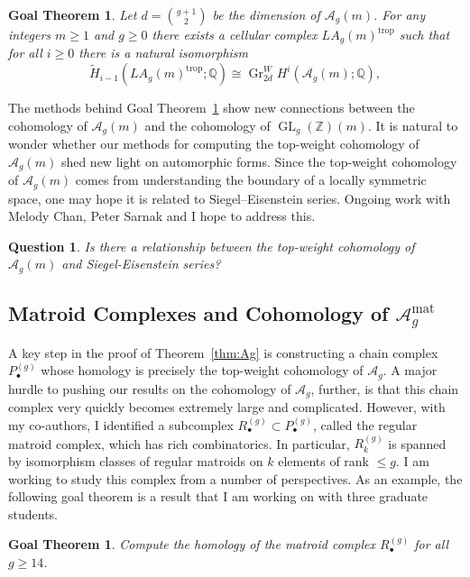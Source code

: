 \documentclass[11pt,reqno]{amsart}
\newtheorem{goalTheorem}[lemma]{Goal Theorem}
\newtheorem{question}[lemma]{Question}
\theoremstyle{remark}
\newcommand{\Gr}{\operatorname{Gr}}
\newcommand{\GL}{{\operatorname{GL}}}
\newcommand{\trop}{\operatorname{trop}}
\newcommand{\cA}{\mathcal{A}}
\newcommand{\Q}{\mathbb{Q}}
\newcommand{\Z}{\mathbb{Z}}
\begin{document}
\begin{goalTheorem}\label{goalThm:agm}
Let $d=\binom{g+1}{2}$ be the dimension of $\cA_{g}(m)$. For any integers $m\geq1$ and $g\geq0$ there exists a cellular complex $LA_{g}(m)^{\trop}$ such that for all $i\geq0$ there is a natural isomorphism
\[
\tilde{H}_{i-1}\left(LA_{g}(m)^{\trop};\Q\right) \cong \Gr_{2d}^W\!H^{i}\left(\cA_{g}(m);\mathbb{Q}\right),
\]
\end{goalTheorem}

The methods behind  Goal Theorem~\ref{goalThm:agm} show new connections between the cohomology of $\cA_{g}(m)$ and the cohomology of $\GL_{g}(\Z)(m)$.  It is natural to wonder whether our methods for computing the top-weight cohomology of $\cA_{g}(m)$ shed new light on automorphic forms. Since the top-weight cohomology of $\cA_{g}(m)$ comes from understanding the boundary of a locally symmetric space, one may hope it is related to Siegel--Eisenstein series. Ongoing work with Melody Chan, Peter Sarnak and I hope to address this.

\begin{question}
Is there a relationship between the top-weight cohomology of $\cA_{g}(m)$ and Siegel-Eisenstein series?
\end{question}

\subsection{Matroid Complexes and Cohomology of $\cA_{g}^{\text{mat}}$}

A key step in the proof of Theorem~\ref{thm:Ag} is constructing a chain complex $P^{(g)}_{\bullet}$ whose homology is precisely the top-weight cohomology of $\cA_{g}$. A major hurdle to pushing our results on the cohomology of $\cA_{g}$, further, is that this chain complex very quickly becomes extremely large and complicated. However,  with my co-authors, I identified a subcomplex $R^{(g)}_{\bullet} \subset P^{(g)}_{\bullet}$, called the regular matroid complex, which has rich combinatorics. In particular, $R^{(g)}_{k}$ is spanned by isomorphism classes of regular matroids on $k$ elements of rank $\leq g$.  I am working to study this complex from a number of perspectives. As an example, the following goal theorem is a result that I am working on with three graduate students.

\begin{goalTheorem}
Compute the homology of the matroid complex $R_{\bullet}^{(g)}$ for all $g\geq 14$.
\end{goalTheorem}
\end{document}
